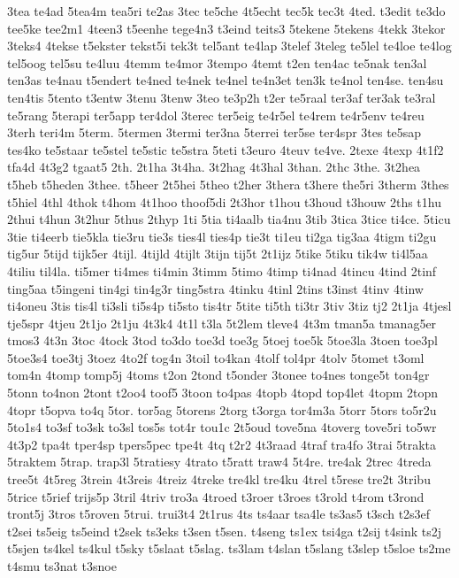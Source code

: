 {3tea
te4ad
5tea4m
tea5ri
te2as
3tec
te5che
4t5echt
tec5k
tec3t
4ted.
t3edit
te3do
tee5ke
tee2m1
4teen3
t5eenhe
tege4n3
t3eind
teits3
5tekene
5tekens
4tekk
3tekor
3teks4
4tekse
t5ekster
tekst5i
tek3t
tel5ant
te4lap
3telef
3teleg
te5lel
te4loe
te4log
tel5oog
tel5su
te4luu
4temm
te4mor
3tempo
4temt
t2en
ten4ac
te5nak
ten3al
ten3as
te4nau
t5endert
te4ned
te4nek
te4nel
te4n3et
ten3k
te4nol
ten4se.
ten4su
ten4tis
5tento
t3entw
3tenu
3tenw
3teo
te3p2h
t2er
te5raal
ter3af
ter3ak
te3ral
te5rang
5terapi
ter5app
ter4dol
3terec
ter5eig
te4r5el
te4rem
te4r5env
te4reu
3terh
teri4m
5term.
5termen
3termi
ter3na
5terrei
ter5se
ter4spr
3tes
te5sap
tes4ko
te5staar
te5stel
te5stic
te5stra
5teti
t3euro
4teuv
te4ve.
2texe
4texp
4t1f2
tfa4d
4t3g2
tgaat5
2th.
2t1ha
3t4ha.
3t2hag
4t3hal
3than.
2thc
3the.
3t2hea
t5heb
t5heden
3thee.
t5heer
2t5hei
5theo
t2her
3thera
t3here
the5ri
3therm
3thes
t5hiel
4thl
4thok
t4hom
4t1hoo
thoof5di
2t3hor
t1hou
t3houd
t3houw
2ths
t1hu
2thui
t4hun
3t2hur
5thus
2thyp
1ti
5tia
ti4aalb
tia4nu
3tib
3tica
3tice
ti4ce.
5ticu
3tie
ti4eerb
tie5kla
tie3ru
tie3s
ties4l
ties4p
tie3t
ti1eu
ti2ga
tig3aa
4tigm
ti2gu
tig5ur
5tijd
tijk5er
4tijl.
4tijld
4tijlt
3tijn
tij5t
2t1ijz
5tike
5tiku
tik4w
ti4l5aa
4tiliu
til4la.
ti5mer
ti4mes
ti4min
3timm
5timo
4timp
ti4nad
4tincu
4tind
2tinf
ting5aa
t5ingeni
tin4gi
tin4g3r
ting5stra
4tinku
4tinl
2tins
t3inst
4tinv
4tinw
ti4oneu
3tis
tis4l
ti3sli
ti5s4p
ti5sto
tis4tr
5tite
ti5th
ti3tr
3tiv
3tiz
tj2
2t1ja
4tjesl
tje5spr
4tjeu
2t1jo
2t1ju
4t3k4
4t1l
t3la
5t2lem
tleve4
4t3m
tman5a
tmanag5er
tmos3
4t3n
3toc
4tock
3tod
to3do
toe3d
toe3g
5toej
toe5k
5toe3la
3toen
toe3pl
5toe3s4
toe3tj
3toez
4to2f
tog4n
3toil
to4kan
4tolf
tol4pr
4tolv
5tomet
t3oml
tom4n
4tomp
tomp5j
4toms
t2on
2tond
t5onder
3tonee
to4nes
tonge5t
ton4gr
5tonn
to4non
2tont
t2oo4
toof5
3toon
to4pas
4topb
4topd
top4let
4topm
2topn
4topr
t5opva
to4q
5tor.
tor5ag
5torens
2torg
t3orga
tor4m3a
5torr
5tors
to5r2u
5to1s4
to3sf
to3sk
to3sl
tos5s
tot4r
tou1c
2t5oud
tove5na
4toverg
tove5ri
to5wr
4t3p2
tpa4t
tper4sp
tpers5pec
tpe4t
4tq
t2r2
4t3raad
4traf
tra4fo
3trai
5trakta
5traktem
5trap.
trap3l
5tratiesy
4trato
t5ratt
traw4
5t4re.
tre4ak
2trec
4treda
tree5t
4t5reg
3trein
4t3reis
4treiz
4treke
tre4kl
tre4ku
4trel
t5rese
tre2t
3tribu
5trice
t5rief
trijs5p
3tril
4triv
tro3a
4troed
t3roer
t3roes
t3rold
t4rom
t3rond
tront5j
3tros
t5roven
5trui.
trui3t4
2t1rus
4ts
ts4aar
tsa4le
ts3as5
t3sch
t2s3ef
t2sei
ts5eig
ts5eind
t2sek
ts3eks
t3sen
t5sen.
t4seng
ts1ex
tsi4ga
t2sij
t4sink
ts2j
t5sjen
ts4kel
ts4kul
t5sky
t5slaat
t5slag.
ts3lam
t4slan
t5slang
t3slep
t5sloe
ts2me
t4smu
ts3nat
t3snoe
}
